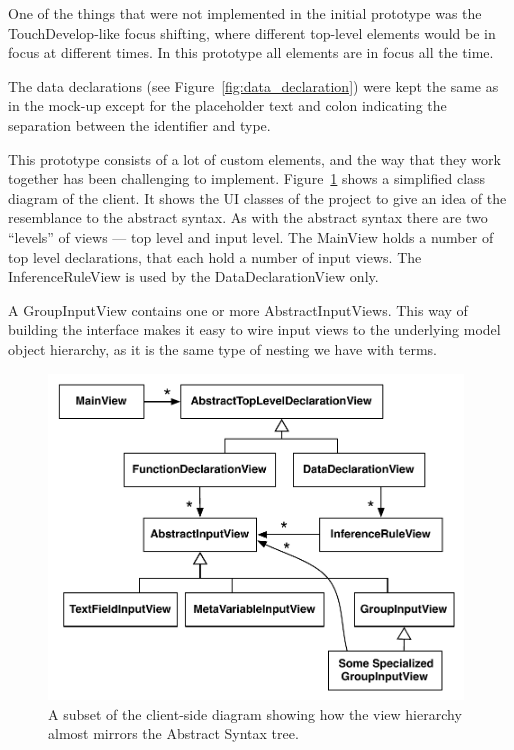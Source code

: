 One of the things that were not implemented in the initial prototype was the
TouchDevelop-like focus shifting, where different top-level elements would be
in focus at different times. In this prototype all elements are in focus all
the time.

The data declarations (see Figure~\ref{fig:data_declaration}) were kept the same as in the mock-up except for the
placeholder text and colon indicating the separation between the identifier and
type.

This prototype consists of a lot of custom elements, and the way that they work
together has been challenging to implement. Figure~\ref{fig:clientViewArchitecture} shows a simplified class diagram of the
client. It shows the UI classes of the project to give an idea of
the resemblance to the abstract syntax. As with the abstract syntax there are
two ``levels'' of views --- top level and input level. The MainView holds a
number of top level declarations, that each hold a number of input views. The
InferenceRuleView is used by the DataDeclarationView only.

A GroupInputView contains one or more AbstractInputViews. This way of building
the interface makes it easy to wire input views to the underlying model object
hierarchy, as it is the same type of nesting we have with terms. 

\begin{figure}
	\centering
		\includegraphics[width=110mm]{diagrams/client_side_class_diagram.pdf}
	\caption{A subset of the client-side diagram showing how the view hierarchy
	almost mirrors the Abstract Syntax tree.}
\label{fig:clientViewArchitecture}
\end{figure}

